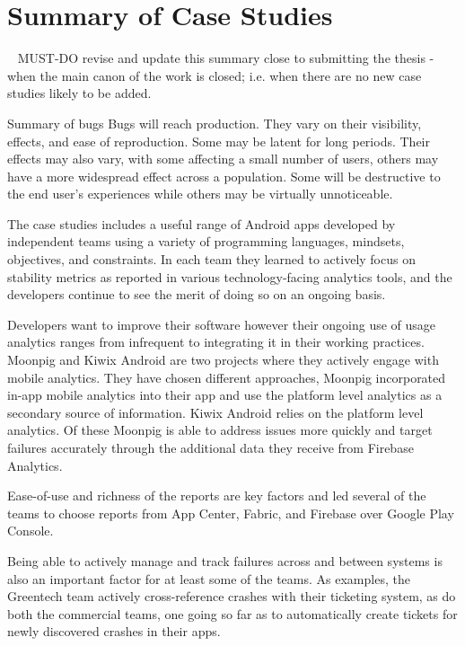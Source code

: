 \section{Summary of Case Studies}~\label{section-summary-of-case-studies}
MUST-DO revise and update this summary close to submitting the thesis - when the main canon of the work is closed; i.e. when there are no new case studies likely to be added.

Summary of bugs
Bugs will reach production. They vary on their visibility, effects, and ease of reproduction. Some may be latent for long periods. Their effects may also vary, with some affecting a small number of users, others may have a more widespread effect across a population. Some will be destructive to the end user's experiences while others may be virtually unnoticeable. 





The case studies includes a useful range of Android apps developed by independent teams using a variety of programming languages, mindsets, objectives, and constraints. In each team they learned to actively focus on stability metrics as reported in various technology-facing analytics tools, and the developers continue to see the merit of doing so on an ongoing basis.

Developers want to improve their software however their ongoing use of usage analytics ranges from infrequent to integrating it in their working practices. Moonpig and Kiwix Android are two projects where they actively engage with mobile analytics. They have chosen different approaches, Moonpig incorporated in-app mobile analytics into their app and use the platform level analytics as a secondary source of information. Kiwix Android relies on the platform level analytics. Of these Moonpig is able to address issues more quickly and target failures accurately through the additional data they receive from Firebase Analytics. 

Ease-of-use and richness of the reports are key factors and led several of the teams to choose reports from App Center, Fabric, and Firebase over Google Play Console.

Being able to actively manage and track failures across and between systems is also an important factor for at least some of the teams. As examples, the Greentech team actively cross-reference crashes with their ticketing system, as do both the commercial teams, one going so far as to automatically create tickets for newly discovered crashes in their apps.


